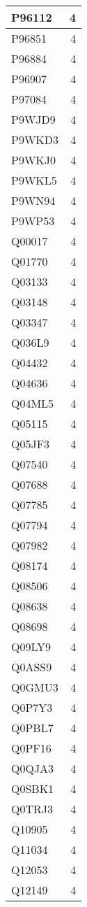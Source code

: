 \documentclass[
]{book}
\theoremstyle{definition}
\theoremstyle{definition}
\theoremstyle{definition}
\theoremstyle{definition}
\theoremstyle{remark}
\begin{document}
\begin{table}
\begin{tabular}{l|r}
\hline
P96112 & 4\\
\hline
P96851 & 4\\
\hline
P96884 & 4\\
\hline
P96907 & 4\\
\hline
P97084 & 4\\
\hline
P9WJD9 & 4\\
\hline
P9WKD3 & 4\\
\hline
P9WKJ0 & 4\\
\hline
P9WKL5 & 4\\
\hline
P9WN94 & 4\\
\hline
P9WP53 & 4\\
\hline
Q00017 & 4\\
\hline
Q01770 & 4\\
\hline
Q03133 & 4\\
\hline
Q03148 & 4\\
\hline
Q03347 & 4\\
\hline
Q036L9 & 4\\
\hline
Q04432 & 4\\
\hline
Q04636 & 4\\
\hline
Q04ML5 & 4\\
\hline
Q05115 & 4\\
\hline
Q05JF3 & 4\\
\hline
Q07540 & 4\\
\hline
Q07688 & 4\\
\hline
Q07785 & 4\\
\hline
Q07794 & 4\\
\hline
Q07982 & 4\\
\hline
Q08174 & 4\\
\hline
Q08506 & 4\\
\hline
Q08638 & 4\\
\hline
Q08698 & 4\\
\hline
Q09LY9 & 4\\
\hline
Q0ASS9 & 4\\
\hline
Q0GMU3 & 4\\
\hline
Q0P7Y3 & 4\\
\hline
Q0PBL7 & 4\\
\hline
Q0PF16 & 4\\
\hline
Q0QJA3 & 4\\
\hline
Q0SBK1 & 4\\
\hline
Q0TRJ3 & 4\\
\hline
Q10905 & 4\\
\hline
Q11034 & 4\\
\hline
Q12053 & 4\\
\hline
Q12149 & 4\\

\end{tabular}
\end{table}
\end{document}
